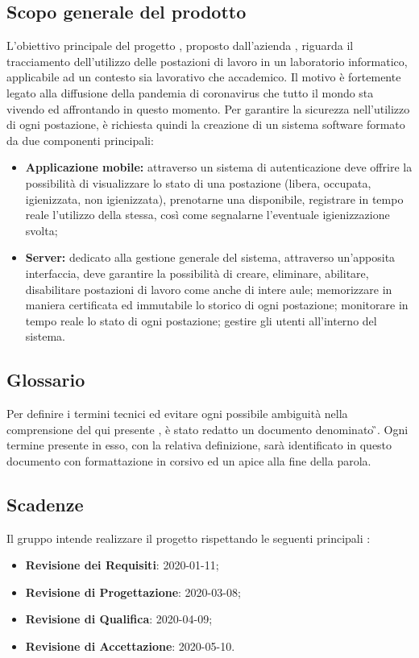 \subsection{Scopo generale del prodotto}
    L'obiettivo principale del progetto \NomeProgetto{}, proposto dall'azienda \proponente{}, riguarda il tracciamento dell'utilizzo delle postazioni di lavoro in un laboratorio informatico, applicabile ad un contesto sia lavorativo che accademico.
    Il motivo è fortemente legato alla diffusione della pandemia di coronavirus che tutto il mondo sta vivendo ed affrontando in questo momento. Per garantire la sicurezza nell'utilizzo di ogni postazione, è richiesta quindi la creazione di un sistema software formato da due componenti principali:
    \begin{itemize}
        \item \textbf{Applicazione mobile:} attraverso un sistema di autenticazione deve offrire la possibilità di visualizzare lo stato di una postazione (libera, occupata, igienizzata, non igienizzata), prenotarne una disponibile, registrare in tempo reale l'utilizzo della stessa, così come segnalarne l'eventuale igienizzazione svolta;
        \item \textbf{Server:} dedicato alla gestione generale del sistema, attraverso un'apposita interfaccia, deve garantire la possibilità di creare, eliminare, abilitare, disabilitare postazioni di lavoro come anche di intere aule; memorizzare in maniera certificata ed immutabile lo storico di ogni postazione; monitorare in tempo reale lo stato di ogni postazione; gestire gli utenti all'interno del sistema.
    \end{itemize}

\subsection{Glossario}
    Per definire i termini tecnici ed evitare ogni possibile ambiguità nella comprensione del qui presente \PdP{}, è stato redatto un documento denominato \G{}. Ogni termine presente in esso, con la relativa definizione, sarà identificato in questo documento con formattazione in corsivo ed un apice \glo{} alla fine della parola.

\subsection{Scadenze}
    Il gruppo \Gruppo{} intende realizzare il progetto \NomeProgetto{} rispettando le seguenti principali :
    \begin{itemize}
        \item \textbf{Revisione dei Requisiti}: 2020-01-11;
        \item \textbf{Revisione di Progettazione}: 2020-03-08;
        \item \textbf{Revisione di Qualifica}: 2020-04-09;
        \item \textbf{Revisione di Accettazione}: 2020-05-10.
    \end{itemize}

